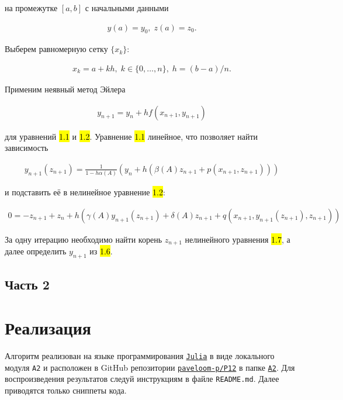 на промежутке $ [a, b] $ с начальными данными

\hs
\begin{gather}
     y(a) = y_0, \; z(a) = z_0.
\end{gather}

Выберем равномерную сетку $ \{x_k\} $:

\hs
\begin{gather}
x_k = a + kh, \; k \in \{0, \dots, n\}, \; h = (b-a)/n.
\end{gather}

Применим неявный метод Эйлера

\hs
\begin{gather}
y_{n+1} = y_n + h f(x_{n+1}, y_{n+1})
\end{gather}

для уравнений \hl{1.1} и \hl{1.2}. Уравнение \hl{1.1} линейное, что позволяет найти зависимость

\hs
\begin{gather}
y_{n+1}(z_{n+1}) = \frac{1}{1 - h \alpha(A)} (y_n + h (\beta(A) z_{n+1} + p(x_{n+1}, z_{n+1})))
\end{gather}

и подставить её в нелинейное уравнение \hl{1.2}:

\hs
\begin{gather}
0 = - z_{n+1} + z_n + h \left( \gamma(A) y_{n+1}(z_{n+1}) + \delta(A) z_{n+1} + q(x_{n+1}, y_{n+1}(z_{n+1}), z_{n+1}) \right)
\end{gather}

За одну итерацию необходимо найти корень $ z_{n+1} $ нелинейного уравнения \hl{1.7}, а далее определить $ y_{n+1} $ из \hl{1.6}.

\newpage

\subsection*{Часть 2}
\section*{Реализация}

\vspace{18pt}

Алгоритм реализован на языке программирования \href{https://julialang.org}{\footnotesize \texttt{Julia}} в виде локального модуля {\footnotesize \texttt{A2}} и расположен в GitHub репозитории \href{https://github.com/paveloom-p/P12}{\footnotesize \texttt{paveloom-p/P12}} в папке \href{https://github.com/paveloom-p/P12/tree/master/A2}{\footnotesize \texttt{A2}}. Для воспроизведения результатов следуй инструкциям в файле {\footnotesize \texttt{README.md}}. Далее приводятся только сниппеты кода.

